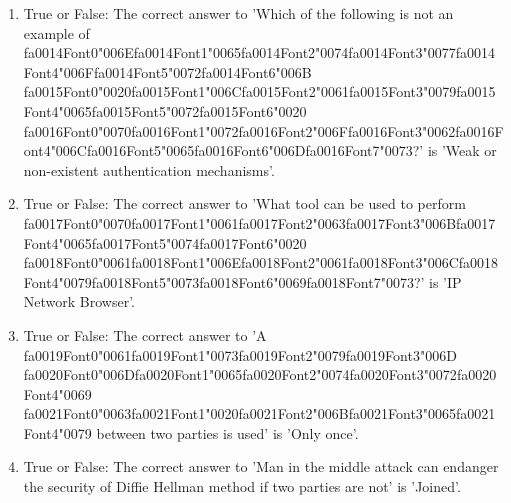 \documentclass[12pt]{article}
\begin{document}
\begin{enumerate}[label=\arabic*.]
\item True or False: The correct answer to 'Which of the following is not an example of {\csname fa0014Font0\endcsname\char"006E}{\csname fa0014Font1\endcsname\char"0065}{\csname fa0014Font2\endcsname\char"0074}{\csname fa0014Font3\endcsname\char"0077}{\csname fa0014Font4\endcsname\char"006F}{\csname fa0014Font5\endcsname\char"0072}{\csname fa0014Font6\endcsname\char"006B} {\csname fa0015Font0\endcsname\char"0020}{\csname fa0015Font1\endcsname\char"006C}{\csname fa0015Font2\endcsname\char"0061}{\csname fa0015Font3\endcsname\char"0079}{\csname fa0015Font4\endcsname\char"0065}{\csname fa0015Font5\endcsname\char"0072}{\csname fa0015Font6\endcsname\char"0020} {\csname fa0016Font0\endcsname\char"0070}{\csname fa0016Font1\endcsname\char"0072}{\csname fa0016Font2\endcsname\char"006F}{\csname fa0016Font3\endcsname\char"0062}{\csname fa0016Font4\endcsname\char"006C}{\csname fa0016Font5\endcsname\char"0065}{\csname fa0016Font6\endcsname\char"006D}{\csname fa0016Font7\endcsname\char"0073}?' is 'Weak or non-existent authentication mechanisms'.
\item True or False: The correct answer to 'What tool can be used to perform {\csname fa0017Font0\endcsname\char"0070}{\csname fa0017Font1\endcsname\char"0061}{\csname fa0017Font2\endcsname\char"0063}{\csname fa0017Font3\endcsname\char"006B}{\csname fa0017Font4\endcsname\char"0065}{\csname fa0017Font5\endcsname\char"0074}{\csname fa0017Font6\endcsname\char"0020} {\csname fa0018Font0\endcsname\char"0061}{\csname fa0018Font1\endcsname\char"006E}{\csname fa0018Font2\endcsname\char"0061}{\csname fa0018Font3\endcsname\char"006C}{\csname fa0018Font4\endcsname\char"0079}{\csname fa0018Font5\endcsname\char"0073}{\csname fa0018Font6\endcsname\char"0069}{\csname fa0018Font7\endcsname\char"0073}?' is 'IP Network Browser'.
\item True or False: The correct answer to 'A {\csname fa0019Font0\endcsname\char"0061}{\csname fa0019Font1\endcsname\char"0073}{\csname fa0019Font2\endcsname\char"0079}{\csname fa0019Font3\endcsname\char"006D} {\csname fa0020Font0\endcsname\char"006D}{\csname fa0020Font1\endcsname\char"0065}{\csname fa0020Font2\endcsname\char"0074}{\csname fa0020Font3\endcsname\char"0072}{\csname fa0020Font4\endcsname\char"0069} {\csname fa0021Font0\endcsname\char"0063}{\csname fa0021Font1\endcsname\char"0020}{\csname fa0021Font2\endcsname\char"006B}{\csname fa0021Font3\endcsname\char"0065}{\csname fa0021Font4\endcsname\char"0079} between two parties is used' is 'Only once'.
\item True or False: The correct answer to 'Man in the middle attack can endanger the security of Diffie Hellman method if two parties are not' is 'Joined'.

\end{enumerate}
\end{document}
